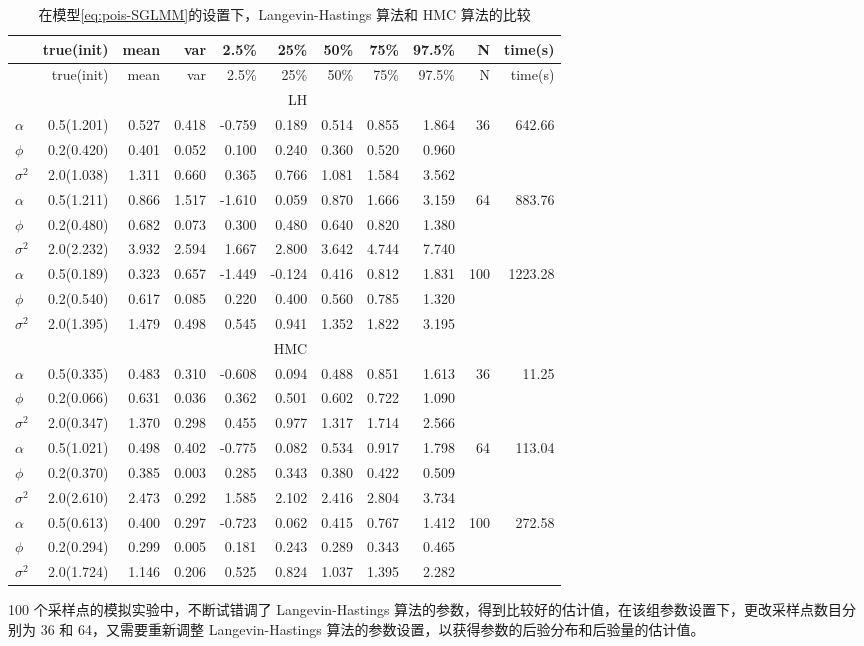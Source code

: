 \documentclass[12pt,a4paper,UTF8,twoside]{book}
\theoremstyle{definition}
\theoremstyle{definition}
\theoremstyle{definition}
\theoremstyle{remark}
\begin{document}
\begin{longtable}[]{@{}lrrrrrrrrrr@{}}
\caption{\label{tab:Pois-MCLV-vs-NUTS} 在模型\eqref{eq:pois-SGLMM}的设置下，Langevin-Hastings 算法和 HMC 算法的比较}\tabularnewline
\toprule
& true(init) & mean & var & 2.5\% & 25\% & 50\% & 75\% & 97.5\% & N & time(s)\tabularnewline
\midrule
\endfirsthead
\toprule
& true(init) & mean & var & 2.5\% & 25\% & 50\% & 75\% & 97.5\% & N & time(s)\tabularnewline
\midrule
\endhead
& & & & & LH & & & & &\tabularnewline
\(\alpha\) & 0.5(1.201) & 0.527 & 0.418 & -0.759 & 0.189 & 0.514 & 0.855 & 1.864 & 36 & 642.66\tabularnewline
\(\phi\) & 0.2(0.420) & 0.401 & 0.052 & 0.100 & 0.240 & 0.360 & 0.520 & 0.960 & &\tabularnewline
\(\sigma^2\) & 2.0(1.038) & 1.311 & 0.660 & 0.365 & 0.766 & 1.081 & 1.584 & 3.562 & &\tabularnewline
\(\alpha\) & 0.5(1.211) & 0.866 & 1.517 & -1.610 & 0.059 & 0.870 & 1.666 & 3.159 & 64 & 883.76\tabularnewline
\(\phi\) & 0.2(0.480) & 0.682 & 0.073 & 0.300 & 0.480 & 0.640 & 0.820 & 1.380 & &\tabularnewline
\(\sigma^2\) & 2.0(2.232) & 3.932 & 2.594 & 1.667 & 2.800 & 3.642 & 4.744 & 7.740 & &\tabularnewline
\(\alpha\) & 0.5(0.189) & 0.323 & 0.657 & -1.449 & -0.124 & 0.416 & 0.812 & 1.831 & 100 & 1223.28\tabularnewline
\(\phi\) & 0.2(0.540) & 0.617 & 0.085 & 0.220 & 0.400 & 0.560 & 0.785 & 1.320 & &\tabularnewline
\(\sigma^2\) & 2.0(1.395) & 1.479 & 0.498 & 0.545 & 0.941 & 1.352 & 1.822 & 3.195 & &\tabularnewline
& & & & & HMC & & & & &\tabularnewline
\(\alpha\) & 0.5(0.335) & 0.483 & 0.310 & -0.608 & 0.094 & 0.488 & 0.851 & 1.613 & 36 & 11.25\tabularnewline
\(\phi\) & 0.2(0.066) & 0.631 & 0.036 & 0.362 & 0.501 & 0.602 & 0.722 & 1.090 & &\tabularnewline
\(\sigma^2\) & 2.0(0.347) & 1.370 & 0.298 & 0.455 & 0.977 & 1.317 & 1.714 & 2.566 & &\tabularnewline
\(\alpha\) & 0.5(1.021) & 0.498 & 0.402 & -0.775 & 0.082 & 0.534 & 0.917 & 1.798 & 64 & 113.04\tabularnewline
\(\phi\) & 0.2(0.370) & 0.385 & 0.003 & 0.285 & 0.343 & 0.380 & 0.422 & 0.509 & &\tabularnewline
\(\sigma^2\) & 2.0(2.610) & 2.473 & 0.292 & 1.585 & 2.102 & 2.416 & 2.804 & 3.734 & &\tabularnewline
\(\alpha\) & 0.5(0.613) & 0.400 & 0.297 & -0.723 & 0.062 & 0.415 & 0.767 & 1.412 & 100 & 272.58\tabularnewline
\(\phi\) & 0.2(0.294) & 0.299 & 0.005 & 0.181 & 0.243 & 0.289 & 0.343 & 0.465 & &\tabularnewline
\(\sigma^2\) & 2.0(1.724) & 1.146 & 0.206 & 0.525 & 0.824 & 1.037 & 1.395 & 2.282 & &\tabularnewline
\bottomrule
\end{longtable}

100 个采样点的模拟实验中，不断试错调了 Langevin-Hastings 算法的参数，得到比较好的估计值，在该组参数设置下，更改采样点数目分别为 36 和 64，又需要重新调整 Langevin-Hastings 算法的参数设置，以获得参数的后验分布和后验量的估计值。
\end{document}

